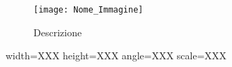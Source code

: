\begin{figure}
  \centering  %
  \texttt{[image: Nome\_Immagine]}
  \caption{Descrizione}
  \label{Image_Tag}
\end{figure}

width=XXX
height=XXX
angle=XXX
scale=XXX


